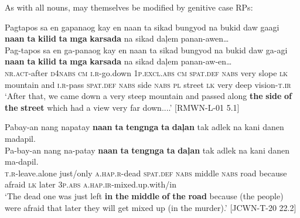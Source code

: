 As with all nouns,  may themselves be modified by genitive case RPs:

\ea
Pagtapos  sa  en  gapanaog  kay  en  naan  ta  sikad bungyod  na  bukid  daw  gaagi  \textbf{naan}  \textbf{ta}  \textbf{kilid}  \textbf{ta}  \textbf{mga}  \textbf{karsada} na  sikad  daļem  panan-awen… \\\smallskip
 \gll Pag-tapos  sa  en  ga-panaog  kay  en  naan  ta  sikad bungyod  na  bukid  daw  ga-agi  \textbf{naan}  \textbf{ta}  \textbf{kilid}  \textbf{ta}  \textbf{mga}  \textbf{karsada} na  sikad  daļem  panan-aw-en… \\
\textsc{nr.act}-after  \textsc{d}4\textsc{nabs}  \textsc{cm}  \textsc{i.r}-go.down  1\textsc{p.excl.abs}  \textsc{cm}  \textsc{spat.def}  \textsc{nabs}  very slope  \textsc{lk}  mountain  and  \textsc{i.r}-pass  \textsc{spat.def}  \textsc{nabs}  side  \textsc{nabs}  \textsc{pl}  street
\textsc{lk}   very  deep  vision-\textsc{t.ir} \\
\glt `After that, we came down a very steep mountain and passed along \textbf{the} \textbf{side} \textbf{of} \textbf{the} \textbf{street} which had a view very far down....’ [RMWN-L-01 5.1]
\z

\ea
Pabay-an  nang  napatay  \textbf{naan}  \textbf{ta}  \textbf{tengnga}  \textbf{ta}  \textbf{daļan} tak  adlek  na  kani  danen  madapil. \\\smallskip
 \gll Pa-bay-an  nang  na-patay  \textbf{naan}  \textbf{ta}  \textbf{tengnga}  \textbf{ta}  \textbf{daļan} tak  adlek  na  kani  danen  ma-dapil. \\
\textsc{t.r}-leave.alone  just/only  \textsc{a.hap.r}-dead  \textsc{spat.def}  \textsc{nabs}  middle  \textsc{nabs}  road
because  afraid  \textsc{lk}  later  3\textsc{p.abs}  \textsc{a.hap.ir}-mixed.up.with/in \\
\glt `The dead one was just left \textbf{in} \textbf{the} \textbf{middle} \textbf{of} \textbf{the} \textbf{road} because (the people) were afraid that later they will get mixed up (in the murder).’ [JCWN-T-20 22.2]
\z


